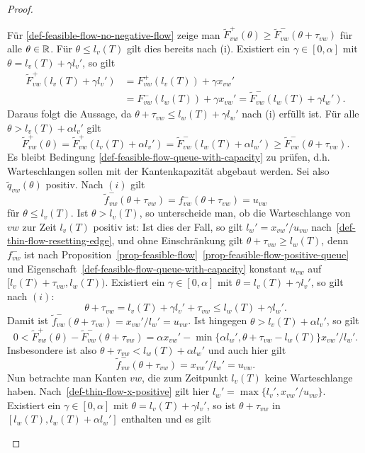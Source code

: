 \begin{proof}
\begin{description}[leftmargin=0cm, topsep=0cm, itemindent=0.5cm]
		Für \ref{def-feasible-flow-no-negative-flow} zeige man $\tilde{F}^+_{vw}(\theta)\geq \tilde{F}_{vw}^-(\theta+\tau_{vw})$ für alle $\theta\in\mathbb{R}$.
		Für $\theta\leq l_v(T)$ gilt dies bereits nach (i).
		Existiert ein $\gamma\in[0, \alpha]$ mit $\theta=l_v(T) + \gamma l_v'$, so gilt
		\begin{align*}
		\tilde{F}_{vw}^+(l_v(T) + \gamma l_v')&=F_{vw}^+(l_v(T))+\gamma x_{vw}'\\
		&= F_{vw}^-(l_w(T))+ \gamma x_{vw}'= \tilde{F}_{vw}^-(l_w(T)+\gamma l_w').
		\end{align*}
		Daraus folgt die Aussage, da $\theta + \tau_{vw}\leq l_w(T) + \gamma l_w'$ nach (i) erfüllt ist.
		Für alle $\theta > l_v(T)+\alpha l_v'$ gilt 
		\[\tilde{F}_{vw}^+(\theta) = \tilde{F}_{vw}^+(l_v(T) + \alpha l_v') = \tilde{F}_{vw}^-(l_w(T) + \alpha l_w') \geq \tilde{F}_{vw}^-(\theta + \tau_{vw}).\]
		Es bleibt Bedingung \ref{def-feasible-flow-queue-with-capacity} zu prüfen, d.h. Warteschlangen sollen mit der Kantenkapazität abgebaut werden.
		Sei also $\tilde{q}_{vw}(\theta)$ positiv.
		Nach $(i)$ gilt
		\[
		\tilde{f}_{vw}^-(\theta + \tau_{vw}) = f_{vw}^-(\theta + \tau_{vw}) = u_{vw}
		\]
		für $\theta\leq l_v(T)$.
		Ist $\theta > l_v(T)$, so unterscheide man, ob die Warteschlange von $vw$ zur Zeit $l_v(T)$ positiv ist:
		Ist dies der Fall, so gilt $l_w' = x_{vw}' / u_{vw}$ nach~\ref{def-thin-flow-resetting-edge}, und ohne Einschränkung gilt $\theta + \tau_{vw} \geq l_w(T)$, denn $f_{vw}^-$ ist nach Proposition~\ref{prop-feasible-flow}~\ref{prop-feasible-flow-positive-queue} und Eigenschaft~\ref{def-feasible-flow-queue-with-capacity} konstant $u_{vw}$ auf $[l_v(T)+\tau_{vw},l_w(T))$.
		Existiert ein $\gamma\in [0, \alpha]$ mit $\theta = l_v(T) + \gamma l_v'$, so gilt nach $(i)$:
		\[
		\theta + \tau_{vw} = l_v(T) + \gamma l_v' + \tau_{vw} \leq l_w(T) + \gamma l_w'.
		\]
		Damit ist $\tilde{f}^-_{vw}(\theta + \tau_{vw}) = x_{vw}'/l_w' = u_{vw}$.
		Ist hingegen $\theta > l_v(T) + \alpha l_v'$, so gilt
		\[
		0<\tilde{F}^+_{vw}(\theta) - \tilde{F}_{vw}^-(\theta +\tau_{vw}) = \alpha x_{vw}' - \min \{ \alpha l_w', \theta + \tau_{vw} - l_w(T) \} x_{vw}' / l_w'.
		\]
		Insbesondere ist also $\theta + \tau_{vw} < l_w(T) + \alpha l_w'$ und auch hier gilt \[
		\tilde{f}^-_{vw}(\theta + \tau_{vw}) = x_{vw}'/l_w' = u_{vw}.
		\]
		Nun betrachte man Kanten $vw$, die zum Zeitpunkt $l_v(T)$ keine Warteschlange haben.
		Nach~\ref{def-thin-flow-x-positive} gilt hier $l_w' = \max \{ l_v', x_{vw}' / u_{vw} \}$.
		Existiert ein $\gamma\in [0, \alpha]$ mit $\theta = l_v(T) + \gamma l_v'$, so ist $\theta+\tau_{vw}$ in $[l_w(T), l_w(T) + \alpha l_w']$ enthalten und es gilt

\end{description}
\end{proof}
